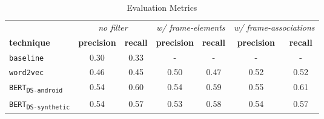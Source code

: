 \begin{table}[H]
\centering    
\begin{small}
\begin{threeparttable}
\begin{tabular}{lcccccc}




& \multicolumn{2}{c}{\textit{no filter}} 
& \multicolumn{2}{c}{\textit{w/ frame-elements}}
& \multicolumn{2}{c}{\textit{w/ frame-associations}}

\\ \cmidrule(l){2-3} \cmidrule(l){4-5} \cmidrule(l){6-7} 




\textbf{technique} & 
\textbf{precision} & \textbf{recall} &
\textbf{precision} & \textbf{recall} &
\textbf{precision} & \textbf{recall} \\ 


\hline


\texttt{baseline} &
0.30 & 0.33 &
- & - &
- & -

\\

\texttt{word2vec} &
0.46 & 0.45 &
0.50 & 0.47 &
0.52 &  0.52 
\\


\texttt{BERT\textsubscript{DS-android}} &
0.54 & 0.60 &
0.54 & 0.59 &
0.55 & 0.61 
\\


\texttt{BERT\textsubscript{DS-synthetic}} &
0.54 & 0.57 &
0.53 & 0.58 &
0.54 & 0.57 
\\

\hline

\end{tabular}
\end{threeparttable}
\end{small}
\caption{Evaluation Metrics}
\label{tbl:techniques-results-overall}
\end{table}

